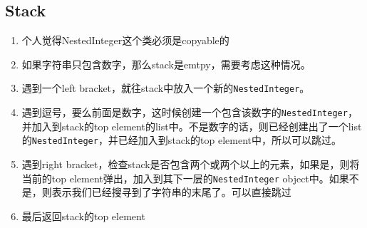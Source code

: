 \subsection{Stack}
\begin{enumerate}
\item 个人觉得NestedInteger这个类必须是copyable的
\item 如果字符串只包含数字，那么stack是emtpy，需要考虑这种情况。
\item 遇到一个left bracket，就往stack中放入一个新的\texttt{NestedInteger}。
\item 遇到逗号，要么前面是数字，这时候创建一个包含该数字的\texttt{NestedInteger}，并加入到stack的top element的list中。不是数字的话，则已经创建出了一个list的\texttt{NestedInteger}，并已经加入到stack的top element中，所以可以跳过。
\item 遇到right bracket，检查stack是否包含两个或两个以上的元素，如果是，则将当前的top element弹出，加入到其下一层的\texttt{NestedInteger} object中。如果不是，则表示我们已经搜寻到了字符串的末尾了。可以直接跳过
\item 最后返回stack的top element
\end{enumerate}

